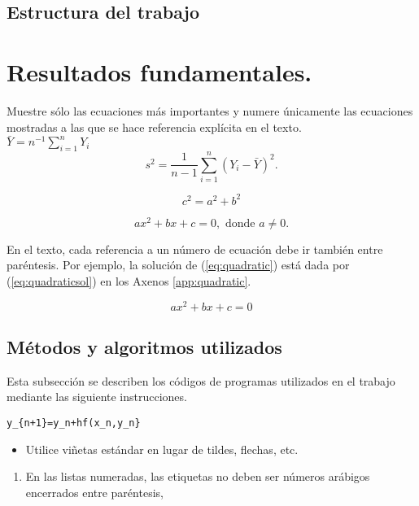 \documentclass{wscpaperproc}
\theoremstyle{wsc}
\begin{document}
\subsection{Estructura del trabajo}

\section{Resultados fundamentales.}

Muestre s\'olo las ecuaciones m\'as importantes y numere \'unicamente las ecuaciones mostradas a las que se hace referencia expl\'icita en el texto. \\

$\bar Y = n^{-1} \sum_{i=1}^n Y_i$\\
$$s^2 = \frac 1 {n-1} \sum_{i=1}^n (Y_i - \bar Y)^2.$$

\[
 c^2=a^2+b^2
\]

\begin{equation}\label{eq:quadratic}
ax^2 + bx + c = 0, \mbox{ donde } a \ne 0.
\end{equation}

En el texto, cada referencia a un n\'umero de ecuaci\'on debe ir tambi\'en entre par\'entesis. Por ejemplo, la soluci\'on de (\ref{eq:quadratic}) est\'a dada por  (\ref{eq:quadraticsol}) en los Axenos \ref{app:quadratic}.


\begin{equation} \label{eq:quadratic_second}
ax^2 + bx + c = 0
\end{equation}

\subsection{M\'etodos y algoritmos utilizados}
Esta  subsecci\'on se describen los c\'odigos de programas utilizados en el trabajo mediante las siguiente instrucciones.

\begin{verbatim}
y_{n+1}=y_n+hf(x_n,y_n}
\end{verbatim}


\begin{itemize}
	\item Utilice vi\~netas est\'andar en lugar de tildes, flechas, etc.
\end{itemize}
\begin{enumerate}
	\item En las listas numeradas, las etiquetas no deben ser n\'umeros ar\'abigos encerrados entre par\'entesis, \cite{simulation}
\end{enumerate}
\end{document}
